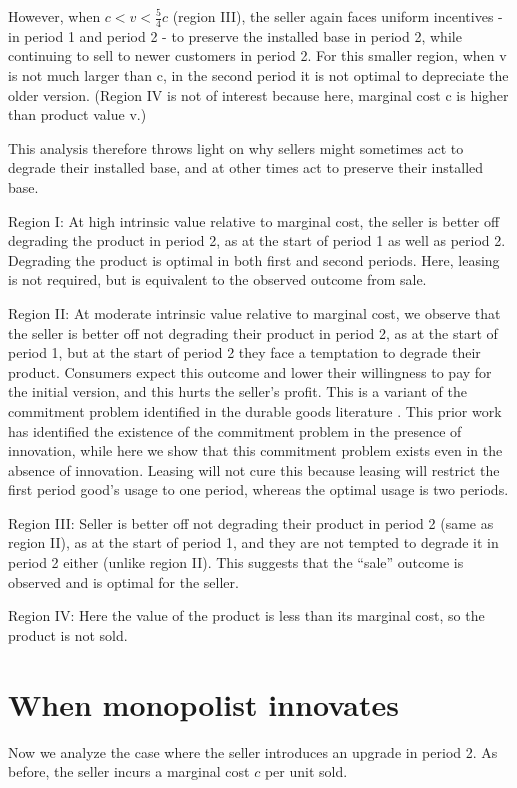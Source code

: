 \documentclass[isre,blindrev]{informs3} %
\begin{document}
However, when \(c<v<\frac{5}{4}c\) (region III), the seller again faces uniform incentives - in period 1 and period 2 - to preserve the installed base in period
2, while continuing to sell to newer customers in period 2. For this smaller region, when v is not much larger than c, in the second period it is
not optimal to depreciate the older version. (Region IV is not of interest because here, marginal cost c is higher than product value v.)

This analysis therefore throws light on why sellers might sometimes act to degrade their installed base, and at other times act to preserve their
installed base.


Region I: At high intrinsic value relative to marginal cost, the seller is better off degrading the product in period 2, as at the start of period 1 as well as period 2. Degrading the product is optimal in both first and second periods. Here, leasing is not required, but is equivalent to the observed outcome from sale.

Region II: At moderate intrinsic value relative to marginal cost, we observe that the seller is better off not degrading their product in period 2, as at the start of period 1, but at the start of period 2 they face a temptation to degrade their product. Consumers expect this outcome and lower their willingness to pay for the initial version, and this hurts the seller{'}s
profit. This is a variant of the commitment problem identified in the durable goods literature \citep{waldman_new_1993, ellison_neo-luddites_2000}. This prior work has identified the existence of the commitment problem in the presence of innovation, while here we show that this commitment problem exists even in the absence of innovation. Leasing \citep{bulow_durable-goods_1982} will not cure this because leasing will restrict the first period good's usage to one period, whereas the optimal usage is two periods.

Region III: Seller is better off not degrading their product in period 2 (same as region II), as at the start of period 1, and they are not tempted
to degrade it in period 2 either (unlike region II). This suggests that the {``}sale{''} outcome is observed and is optimal for the seller.

Region IV: Here the value of the product is less than its marginal cost, so the product is not sold. 

\section{When monopolist innovates }
\label{innovate}
Now we analyze the case where the seller introduces an upgrade in period 2. As before, the seller incurs a marginal cost \(c\) per unit sold. 
\end{document}
